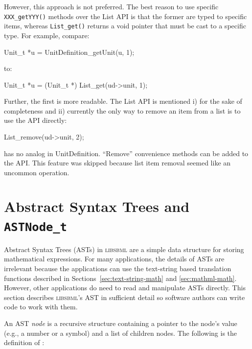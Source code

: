 \documentclass{sbmlmanual}
\newcommand{\libsbml}{\textsc{libsbml}}
\begin{document}
However, this approach is not preferred.  The best reason to use
specific \texttt{XXX\_getYYY()} methods over the List API is that the
former are typed to specific items, whereas \texttt{List\_get()}
returns a void pointer that must be cast to a specific type.  For
example, compare:

\begin{example}[c]
Unit_t *u = UnitDefinition_getUnit(u, 1);
\end{example}

to:

\begin{example}[c]
Unit_t *u = (Unit_t *) List_get(ud->unit, 1);
\end{example}

Further, the first is more readable.  The List API is mentioned i) for
the sake of completeness and ii) currently the only way to remove an
item from a list is to use the API directly:

\begin{example}[c]
List_remove(ud->unit, 2);
\end{example}

has no analog in UnitDefinition.  ``Remove'' convenience methods can be
added to the API.  This feature was skipped because list item removal
seemed like an uncommon operation.


\section{Abstract Syntax Trees and \texttt{ASTNode\_t}}
\label{app:ast}

Abstract Syntax Trees (ASTs) in \libsbml{} are a simple data structure for
storing mathematical expressions.  For many applications, the details of
ASTs are irrelevant because the applications can use the text-string based
translation functions described in Sections~\ref{sec:text-string-math} and
\ref{sec:mathml-math}.  However, other applications do need to read and
manipulate ASTs directly.  This section describes \libsbml{}'s AST in
sufficient detail so software authors can write code to work with them.

An AST \emph{node} is a recursive structure containing a pointer to the
node's value (e.g., a number or a symbol) and a list of children nodes.
The following is the definition of :
\end{document}

